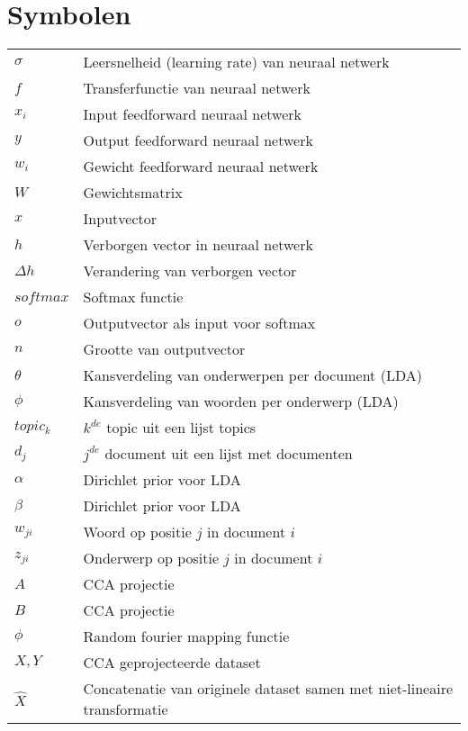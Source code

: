 \documentclass[master=cws,masteroption=ai]{kulemt}
\begin{document}
\section*{Symbolen}
\begin{flushleft}
  \renewcommand{\arraystretch}{1.1}
  \begin{tabularx}{\textwidth}{@{}p{25mm}X@{}}
    $\sigma$    & Leersnelheid (learning rate) van neuraal netwerk \\
    $f$         & Transferfunctie van neuraal netwerk\\
    $x_i$       & Input feedforward neuraal netwerk\\
    $y$			& Output feedforward neuraal netwerk\\
    $w_i$ 		& Gewicht feedforward neuraal netwerk\\
    $W$         & Gewichtsmatrix\\
    $x$			& Inputvector\\
    $h$         & Verborgen vector in neuraal netwerk\\
    $\Delta h$   & Verandering van verborgen vector\\
    $softmax$   & Softmax functie\\
    $o$			& Outputvector als input voor softmax\\
    $n$			& Grootte van outputvector\\
    $\theta$    & Kansverdeling van onderwerpen per document (LDA) \\
    $\phi$      & Kansverdeling van woorden per onderwerp (LDA)  \\  
	$topic_k$   & $k^{de}$ topic uit een lijst topics \\
	$d_j$       & $j^{de}$ document uit een lijst met documenten\\
	$\alpha$    & Dirichlet prior voor LDA\\
	$\beta$     & Dirichlet prior voor LDA\\
	$w_{ji}$    & Woord op positie $j$ in document $i$\\
	$z_{ji}$    & Onderwerp op positie $j$ in document $i$\\
	$A$         & CCA projectie\\
	$B$         & CCA projectie\\
	$\phi$      & Random fourier mapping functie\\
	$X,Y$       & CCA geprojecteerde dataset\\
	$\hat{X}$	& Concatenatie van originele dataset samen met niet-lineaire transformatie\\

\end{tabularx}
\end{flushleft}
\end{document}

